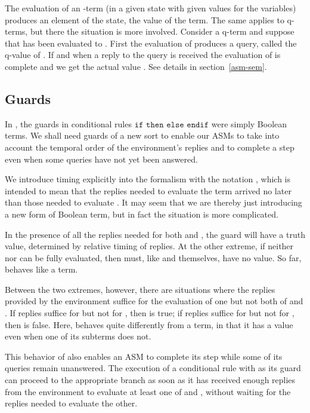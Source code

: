 \documentclass{LMCS}
\theoremstyle{definition}
\newcommand{\ttt}[1]{\ensuremath{\mathtt {#1}}}
\begin{document}
The evaluation of an -term (in a given state with given values for
the variables) produces an element of the state, the value of the
term.  The same applies to q-terms, but there the situation is more
involved.  Consider a q-term  and suppose that 
has been evaluated to .  First the evaluation of 
produces a query, called the q-value of .  If and when a reply to
the query is received the evaluation of  is complete and we get the
actual value .  See details in section~\ref{asm-sem}.

\subsection{Guards}

In \cite{oa2}, the guards  in conditional rules \ttt{if} 
\ttt{then}  \ttt{else}  \ttt{endif} were simply Boolean
terms.  We shall need guards of a new sort to enable our ASMs to take
into account the temporal order of the environment's replies and to
complete a step even when some queries have not yet been answered.

We introduce timing explicitly into the formalism with the notation
, which is intended to mean that the replies needed to
evaluate the term  arrived no later than those needed to evaluate
.  It may seem that we are thereby just introducing a new
form of Boolean term, but in fact the situation is more complicated.

In the presence of
all the replies needed for both  and , the guard 
will have a truth value, determined by relative timing of replies.
At the other extreme, if neither  nor  can be
fully evaluated,
then  must, like  and
 themselves, have no value.  So far,  behaves like
a term.

Between the two extremes, however, there are situations where
the replies provided by the environment suffice for the evaluation
of one but not both of  and . If replies suffice for  but
not for , then  is true; if replies suffice for 
but not for , then  is false. Here, 
behaves quite differently from a term, in that it has a value even
when one of its subterms does not.

This behavior of  also enables an ASM to complete its
step while some of its queries remain unanswered.  The execution of a
conditional rule with  as its guard can proceed to the
appropriate branch as soon as it has received enough replies from the
environment to evaluate at least one of  and , without waiting
for the replies needed to evaluate the other.
\end{document}
